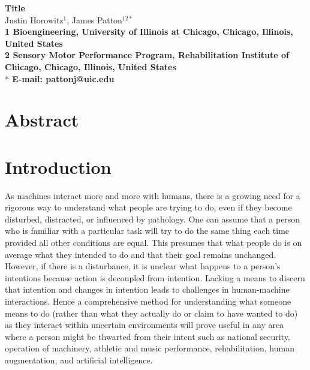 \documentclass[10pt]{article}
\date{}
\begin{document}
\begin{flushleft}
{\Large
\textbf{Title}
}
\\
Justin Horowitz$^{1}$, 
James Patton$^{12\ast}$
\\
\bf{1} Bioengineering, University of Illinois at Chicago, Chicago, Illinois, United States
\\
\bf{2} Sensory Motor Performance Program, Rehabilitation Institute of Chicago, Chicago, Illinois, United States
\\
$\ast$ E-mail: pattonj@uic.edu
\end{flushleft}

\section*{Abstract}


\section*{Introduction}
As machines interact more and more with humans, there is a growing need for a rigorous way to understand what people are trying to do, even if they become disturbed, distracted, or influenced by pathology. One can assume that a person who is familiar with a particular task will try to do the same thing each time provided all other conditions are equal. This presumes that what people do is on average what they intended to do and that their goal remains unchanged. However, if there is a disturbance, it is unclear what happens to a person's intentions because action is decoupled from intention. Lacking a means to discern that intention and changes in intention leads to challenges in human-machine interactions. Hence a comprehensive method for understanding what someone means to do (rather than what they actually do or claim to have wanted to do) as they interact within uncertain environments will prove useful in any area where a person might be thwarted from their intent such as national security, operation of machinery, athletic and music performance, rehabilitation, human augmentation, and artificial intelligence.
\end{document}
